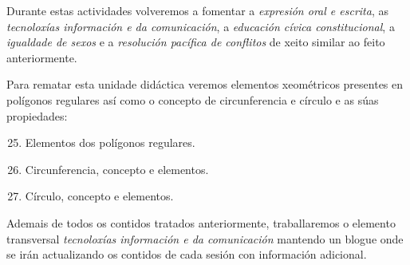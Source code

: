 Durante estas actividades volveremos a fomentar a \emph{expresión oral e escrita}, as \emph{tecnoloxías información e da comunicación}, a \emph{educación cívica constitucional}, a \emph{igualdade de sexos} e a \emph{resolución pacífica de conflitos} de xeito similar ao feito anteriormente.

Para rematar esta unidade didáctica veremos elementos xeométricos presentes en polígonos regulares así como o concepto de circunferencia e círculo e as súas propiedades:

\begin{enumerate}[label=\bfseries Con\arabic*, align=left, leftmargin=1.5cm]
  \setcounter{enumi}{24}
  \item\label{con:regulares} Elementos dos polígonos regulares.
  \item\label{con:circunferencia} Circunferencia, concepto e elementos.
  \item\label{con:circulo} Círculo, concepto e elementos.
\end{enumerate}

Ademais de todos os contidos tratados anteriormente, traballaremos o elemento transversal \emph{tecnoloxías información e da comunicación} mantendo un blogue onde se irán actualizando os contidos de cada sesión con información adicional.

